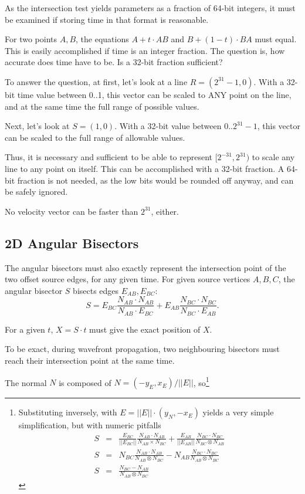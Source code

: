\documentclass[12pt,a4paper,oneside,openany]{article}
\begin{document}
As the intersection test yields parameters as a fraction of 64-bit integers, it must be examined if storing time in that format is reasonable.

For two points $A,B$, the equations $A + t \cdot AB$ and $B + (1-t) \cdot BA$ must equal. This is easily accomplished if time is an integer fraction. The question is, how accurate does time have to be. Is a 32-bit fraction sufficient?

To answer the question, at first, let's look at a line $R = (2^{31}-1,0)$. With a 32-bit time value between 0..1, this vector can be scaled to ANY point on the line, and at the same time the full range of possible values.

Next, let's look at $S = (1,0)$. With a 32-bit value between $0..2^{31}-1$, this vector can be scaled to the full range of allowable values.

Thus, it is necessary and sufficient to be able to represent $[2^{-31}, 2^{31})$ to scale any line to any point on itself. This can be accomplished with a 32-bit fraction. A 64-bit fraction is not needed, as the low bits would be rounded off anyway, and can be safely ignored.

No velocity vector can be faster than $2^{31}$, either.

\subsection{2D Angular Bisectors}

The angular bisectors must also exactly represent the intersection point of the two offset source edges, for any given time. For given source vertices $A,B,C$, the angular bisector $S$ bisects edges $E_{AB}, E_{BC}$:
$$ S = E_{BC} \frac{N_{AB} \cdot N_{AB}}{N_{AB} \cdot E_{BC}} +  E_{AB} \frac{N_{BC} \cdot N_{BC}}{N_{BC} \cdot E_{AB}}.$$

For a given $t$, $X = S \cdot t$ must give the exact position of $X$.

To be exact, during wavefront propagation, two neighbouring bisectors must reach their intersection point at the same time.

The normal $N$ is composed of $N = (-y_E, x_E) / ||E||$, so\footnote{
Substituting inversely, with $E = ||E||\cdot(y_N, -x_E)$ yields a very simple simplification, but with numeric pitfalls
\begin{eqnarray*}
S &=& \frac{E_{BC}}{||E_{BC}||} \frac{N_{AB} \cdot N_{AB}}{N_{AB} \times N_{BC}} +  \frac{E_{AB}}{||E_{AB}||} \frac{N_{BC} \cdot N_{BC}}{N_{BC} \otimes N_{AB}} \\
S &=& {N_{BC}} \frac{N_{AB} \cdot N_{AB}}{N_{AB} \otimes N_{BC}} - N_{AB} \frac{N_{BC} \cdot N_{BC}}{N_{AB} \otimes N_{BC}} \\
S &=& \frac{N_{BC} - N_{AB}}{N_{AB} \otimes N_{BC}}
\end{eqnarray*}
}
\end{document}
